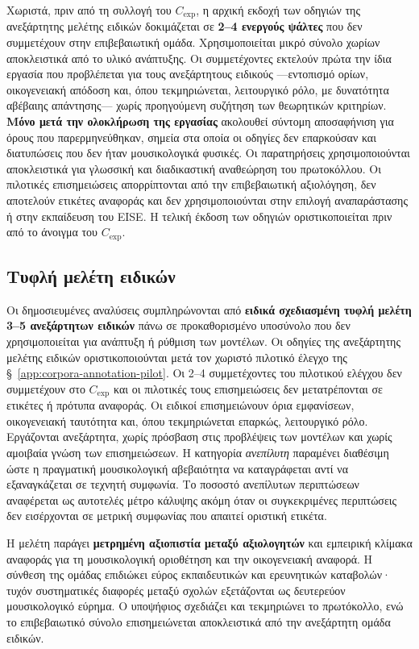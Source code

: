 \documentclass[11pt,a4paper]{article}
\begin{document}
Χωριστά, πριν από τη συλλογή του $C_{\mathrm{exp}}$, η αρχική εκδοχή των οδηγιών της ανεξάρτητης μελέτης ειδικών δοκιμάζεται σε \textbf{2--4 ενεργούς ψάλτες} που δεν συμμετέχουν στην επιβεβαιωτική ομάδα. Χρησιμοποιείται μικρό σύνολο χωρίων αποκλειστικά από το υλικό ανάπτυξης. Οι συμμετέχοντες εκτελούν πρώτα την ίδια εργασία που προβλέπεται για τους ανεξάρτητους ειδικούς ---εντοπισμό ορίων, οικογενειακή απόδοση και, όπου τεκμηριώνεται, λειτουργικό ρόλο, με δυνατότητα αβέβαιης απάντησης--- χωρίς προηγούμενη συζήτηση των θεωρητικών κριτηρίων. \textbf{Μόνο μετά την ολοκλήρωση της εργασίας} ακολουθεί σύντομη αποσαφήνιση για όρους που παρερμηνεύθηκαν, σημεία στα οποία οι οδηγίες δεν επαρκούσαν και διατυπώσεις που δεν ήταν μουσικολογικά φυσικές. Οι παρατηρήσεις χρησιμοποιούνται αποκλειστικά για γλωσσική και διαδικαστική αναθεώρηση του πρωτοκόλλου. Οι πιλοτικές επισημειώσεις απορρίπτονται από την επιβεβαιωτική αξιολόγηση, δεν αποτελούν ετικέτες αναφοράς και δεν χρησιμοποιούνται στην επιλογή αναπαράστασης ή στην εκπαίδευση του EISE. Η τελική έκδοση των οδηγιών οριστικοποιείται πριν από το άνοιγμα του $C_{\mathrm{exp}}$.

\subsection{Τυφλή μελέτη ειδικών}\label{app:corpora-experts}

Οι δημοσιευμένες αναλύσεις συμπληρώνονται από \textbf{ειδικά σχεδιασμένη τυφλή μελέτη 3--5 ανεξάρτητων ειδικών} πάνω σε προκαθορισμένο υποσύνολο που δεν χρησιμοποιείται για ανάπτυξη ή ρύθμιση των μοντέλων. Οι οδηγίες της ανεξάρτητης μελέτης ειδικών οριστικοποιούνται μετά τον χωριστό πιλοτικό έλεγχο της §~\ref{app:corpora-annotation-pilot}. Οι 2--4 συμμετέχοντες του πιλοτικού ελέγχου δεν συμμετέχουν στο $C_{\mathrm{exp}}$ και οι πιλοτικές τους επισημειώσεις δεν μετατρέπονται σε ετικέτες ή πρότυπα αναφοράς. Οι ειδικοί επισημειώνουν όρια εμφανίσεων, οικογενειακή ταυτότητα και, όπου τεκμηριώνεται επαρκώς, λειτουργικό ρόλο. Εργάζονται ανεξάρτητα, χωρίς πρόσβαση στις προβλέψεις των μοντέλων και χωρίς αμοιβαία γνώση των επισημειώσεων. Η κατηγορία \emph{ανεπίλυτη} παραμένει διαθέσιμη ώστε η πραγματική μουσικολογική αβεβαιότητα να καταγράφεται αντί να εξαναγκάζεται σε τεχνητή συμφωνία. Το ποσοστό ανεπίλυτων περιπτώσεων αναφέρεται ως αυτοτελές μέτρο κάλυψης ακόμη όταν οι συγκεκριμένες περιπτώσεις δεν εισέρχονται σε μετρική συμφωνίας που απαιτεί οριστική ετικέτα.

Η μελέτη παράγει \textbf{μετρημένη αξιοπιστία μεταξύ αξιολογητών} και εμπειρική κλίμακα αναφοράς για τη μουσικολογική οριοθέτηση και την οικογενειακή αναφορά. Η σύνθεση της ομάδας επιδιώκει εύρος εκπαιδευτικών και ερευνητικών καταβολών· τυχόν συστηματικές διαφορές μεταξύ σχολών εξετάζονται ως δευτερεύον μουσικολογικό εύρημα. Ο υποψήφιος σχεδιάζει και τεκμηριώνει το πρωτόκολλο, ενώ το επιβεβαιωτικό σύνολο επισημειώνεται αποκλειστικά από την ανεξάρτητη ομάδα ειδικών.
\end{document}
